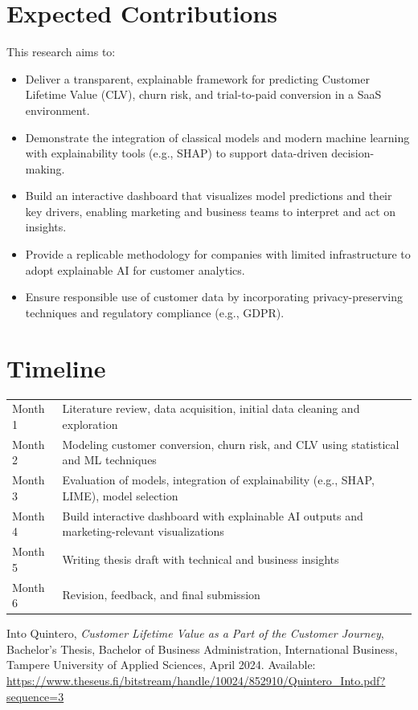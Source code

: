 \documentclass[12pt,a4paper]{article}
\begin{document}
\section{Expected Contributions}
This research aims to:
\begin{itemize}[leftmargin=*]
    \item Deliver a transparent, explainable framework for predicting Customer Lifetime Value (CLV), churn risk, and trial-to-paid conversion in a SaaS environment.
    \item Demonstrate the integration of classical models and modern machine learning with explainability tools (e.g., SHAP) to support data-driven decision-making.
    \item Build an interactive dashboard that visualizes model predictions and their key drivers, enabling marketing and business teams to interpret and act on insights.
    \item Provide a replicable methodology for companies with limited infrastructure to adopt explainable AI for customer analytics.
    \item Ensure responsible use of customer data by incorporating privacy-preserving techniques and regulatory compliance (e.g., GDPR).
\end{itemize}

\section{Timeline}
\begin{tabular}{p{2cm}p{12cm}}
\toprule
Month 1 & Literature review, data acquisition, initial data cleaning and exploration \\
Month 2 & Modeling customer conversion, churn risk, and CLV using statistical and ML techniques \\
Month 3 & Evaluation of models, integration of explainability (e.g., SHAP, LIME), model selection \\
Month 4 & Build interactive dashboard with explainable AI outputs and marketing-relevant visualizations \\
Month 5 & Writing thesis draft with technical and business insights \\
Month 6 & Revision, feedback, and final submission \\
\bottomrule
\end{tabular}

\newpage

\begin{thebibliography}{9}

Into Quintero,  
\textit{Customer Lifetime Value as a Part of the Customer Journey},  
Bachelor’s Thesis, Bachelor of Business Administration, International Business,  
Tampere University of Applied Sciences, April 2024.  
Available: \url{https://www.theseus.fi/bitstream/handle/10024/852910/Quintero_Into.pdf?sequence=3}

\end{thebibliography}
\end{document}
